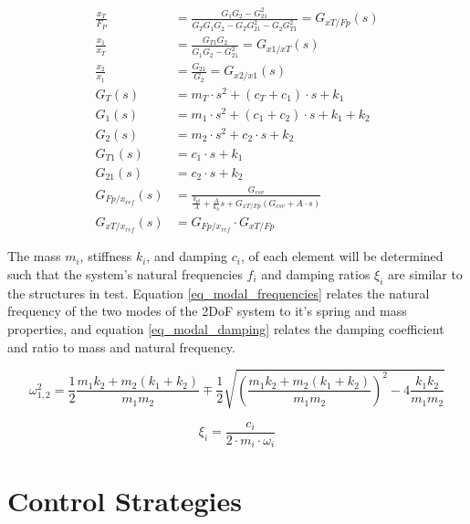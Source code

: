 \documentclass[  10pt, twoside]{report} %
\numberwithin{equation}{chapter}
\begin{document}
\begin{align}
    \frac{x_T}{F_P} &= \frac{G_1 G_2 - G_{21}^2}{G_T G_1 G_2 - G_T G_{21}^2 - G_2 G_{T1}^2} = G_{xT/Fp}(s) \label{G_xT_Fp}\\
    \frac{x_1}{x_T} &= \frac{G_{T1} G_2}{G_1 G_2 - G_{21}^2} = G_{x1/xT}(s) \\
    \frac{x_2}{x_1} &= \frac{G_{21}}{G_2} = G_{x2/x1}(s)\\
    G_T(s) &= m_T\cdot s^2 + (c_T + c_1)\cdot s + k_1 \\
    G_1(s) &= m_1\cdot s^2 + (c_1 + c_2)\cdot s + k_1 + k_2 \\
    G_2(s) &= m_2\cdot s^2 + c_2\cdot s + k_2 \\
    G_{T1}(s) &= c_1\cdot s + k_1 \\
    G_{21}(s) &= c_2\cdot s + k_2 \\
    G_{Fp/x_{ref}}(s) &= \frac{G_{csv}}{\frac{k_{pl}}{A} + \frac{A}{k_h} s + G_{xT/Fp} (G_{csv} + A\cdot s)} \\
    G_{xT/x_{ref}}(s) &= G_{Fp/x_{ref}} \cdot G_{xT/Fp} 
\end{align}

The mass $m_i$, stiffness $k_i$, and damping $c_i$, of each element will be determined such that the system's natural frequencies $f_i$ and damping ratios $\xi_i$ are similar to the structures in test. Equation \eqref{eq_modal_frequencies} relates the natural frequency of the two modes of the 2DoF system to it's spring and mass properties, and equation \eqref{eq_modal_damping} relates the damping coefficient and ratio to mass and natural frequency.

\begin{equation}\label{eq_modal_frequencies}
\omega_{1,2}^{2} = \frac{1}{2}\frac{m_1 k_2 + m_2 (k_1 + k_2)}{m_1 m_2} \mp \frac{1}{2} \sqrt{\left( \frac{m_1 k_2 + m_2 (k_1 + k_2)}{m_1 m_2} \right)^2 - 4 \frac{k_1 k_2}{m_1 m_2}} 
\end{equation}

\begin{equation}\label{eq_modal_damping} 
    \xi_i = \frac{ c_i}{2\cdot m_i\cdot \omega_i}
\end{equation}

\section{Control Strategies}
\end{document}
